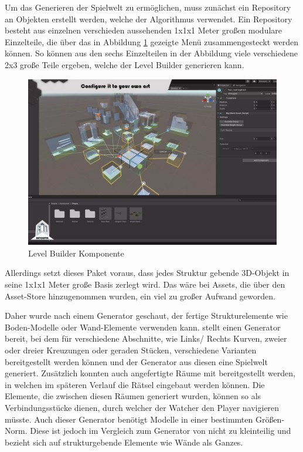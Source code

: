 Um das Generieren der Spielwelt zu ermöglichen, muss zunächst ein Repository an Objekten erstellt werden, welche der Algorithmus verwendet. Ein Repository besteht aus einzelnen verschieden aussehenden 1x1x1 Meter großen modulare Einzelteile, die über das in Abbildung \ref{fig:repository-generator} gezeigte Menü zusammengesteckt werden können. So können aus den sechs Einzelteilen in der Abbildung viele verschiedene 2x3 große Teile ergeben, welche der Level Builder generieren kann.

\begin{figure}[ht]
\centering
\includegraphics[width=1\linewidth]{content/pictures/FirstSteps02.png}
\caption{Level Builder Komponente \cite{alasl_autolevel_nodate}}
\label{fig:repository-generator}
\end{figure}

Allerdings setzt dieses Paket voraus, dass jedes Struktur gebende \ac{3D}-Objekt in seine 1x1x1 Meter große Basis zerlegt wird. Das wäre bei Assets, die über den Asset-Store hinzugenommen wurden, ein viel zu großer Aufwand geworden.

Daher wurde nach einem Generator geschaut, der fertige Strukturelemente wie Boden-Modelle oder Wand-Elemente verwenden kann. \cite{mysticforge_low_nodate} stellt einen Generator bereit, bei dem für verschiedene Abschnitte, wie Links/ Rechts Kurven, zweier oder dreier Kreuzungen oder geraden Stücken, verschiedene Varianten bereitgestellt werden können und der Generator aus diesen eine Spielwelt generiert. Zusätzlich konnten auch angefertigte Räume mit bereitgestellt werden, in welchen im späteren Verlauf die Rätsel eingebaut werden können. Die Elemente, die zwischen diesen Räumen generiert wurden, können so als Verbindungsstücke dienen, durch welcher der Watcher den Player navigieren müsste. Auch dieser Generator benötigt Modelle in einer bestimmten Größen-Norm. Diese ist jedoch im Vergleich zum Generator von \cite{alasl_autolevel_nodate} nicht zu kleinteilig und bezieht sich auf strukturgebende Elemente wie Wände als Ganzes.


